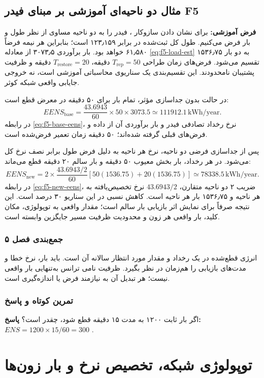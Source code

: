 \documentclass[11pt,a4paper,oneside]{book}
\newcommand{\code}[1]{\lr{\texttt{#1}}}
\newcommand{\unit}[1]{\,\mathrm{#1}}
\newcommand{\summary}[1]{\subsection*{جمع‌بندی فصل #1}}
\newcommand{\exercise}{\subsection*{تمرین کوتاه و پاسخ}}
\newcommand{\answer}{\noindent\textbf{پاسخ:} }
\newcommand{\assumption}{\noindent\textbf{فرض آموزشی:} }
\begin{document}
\section{مثال دو ناحیه‌ای آموزشی بر مبنای فیدر F5}
\assumption برای نشان دادن سازوکار ، فیدر \code{F5} را به دو ناحیه مساوی از نظر طول و بار فرض می‌کنیم. طول کل ثبت‌شده در \code{ELWOML} برابر ۱۲۳٫۱۵۹  است؛ بنابراین هر نیمه فرضاً ۶۱٫۵۸۰  خواهد بود. بار برآوردی ۳۰۷۳٫۵  از معادله \eqref{eq:f5-load-est} به دو بار ۱۵۳۶٫۷۵  تقسیم می‌شود. فرض‌های زمان طراحی $T_{\mathrm{rep}}=50$ دقیقه، $T_{\mathrm{restore}}=20$ دقیقه و ظرفیت پشتیبان نامحدودند. این تقسیم‌بندی یک سناریوی محاسباتی آموزشی است، نه خروجی جایابی واقعی شبکه کوثر.

در حالت بدون جداسازی مؤثر، تمام بار برای ۵۰ دقیقه در معرض قطع است:
\begin{equation}
 EENS_{\mathrm{base}}=\frac{43.6943}{60}\times50\times3073.5
 \simeq111912.1\unit{kWh/year}.
 \label{eq:f5-base-eens}
\end{equation}
در رابطه \eqref{eq:f5-base-eens}، نرخ رخداد تصادفی فیدر \code{F5} و بار برآوردی آن از داده و فرض‌های قبلی گرفته شده‌اند؛ ۵۰ دقیقه زمان تعمیر فرض‌شده است.

پس از جداسازی فرضی دو ناحیه، نرخ هر ناحیه به دلیل فرض طول برابر نصف نرخ کل می‌شود. در هر رخداد، بار بخش معیوب ۵۰ دقیقه و بار سالم ۲۰ دقیقه قطع می‌ماند:
\begin{equation}
 EENS_{\mathrm{new}}=2\times\frac{43.6943/2}{60}\left[50(1536.75)+20(1536.75)\right]
 \simeq78338.5\unit{kWh/year}.
 \label{eq:f5-new-eens}
\end{equation}
در رابطه \eqref{eq:f5-new-eens}، ضریب ۲ دو ناحیه متقارن، $43.6943/2$ نرخ تخصیص‌یافته به هر ناحیه و ۱۵۳۶٫۷۵  بار هر ناحیه است. کاهش نسبی در این سناریو ۳۰ درصد است. این نتیجه صرفاً برای نمایش اثر بازیابی بار سالم است؛ مقدار واقعی به توپولوژی، مکان کلید، بار واقعی هر زون و محدودیت ظرفیت مسیر جایگزین وابسته است.

\summary{۵}
 انرژی قطع‌شده در یک رخداد و  مقدار مورد انتظار سالانه آن است.  باید بار، نرخ خطا و مدت‌های بازیابی را هم‌زمان در نظر بگیرد. ظرفیت نامی ترانس به‌تنهایی بار واقعی نیست؛ هر تبدیل آن به  نیازمند فرض یا اندازه‌گیری است.

\exercise
اگر بار ثابت ۱۲۰۰  به مدت ۱۵ دقیقه قطع شود،  چقدر است؟
\answer $ENS=1200\times15/60=300$ .

\chapter{توپولوژی شبکه، تخصیص نرخ و بار زون‌ها}
\end{document}
